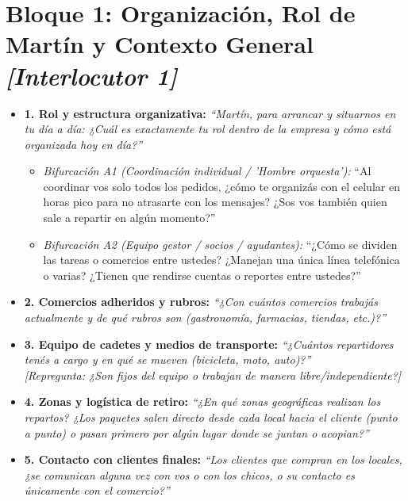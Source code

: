 \documentclass[11pt,a4paper]{article}
\begin{document}
\section*{Bloque 1: Organización, Rol de Martín y Contexto General \hfill \normalfont\small\itshape [Interlocutor 1]}
\begin{itemize}
  \item \textbf{1. Rol y estructura organizativa:}
  \textit{``Martín, para arrancar y situarnos en tu día a día: ¿Cuál es exactamente tu rol dentro de la empresa y cómo está organizada hoy en día?''}
  
  \begin{itemize}[label=$\circ$]
    \item \textit{Bifurcación A1 (Coordinación individual / 'Hombre orquesta'):} 
    ``Al coordinar vos solo todos los pedidos, ¿cómo te organizás con el celular en horas pico para no atrasarte con los mensajes? ¿Sos vos también quien sale a repartir en algún momento?''
    \item \textit{Bifurcación A2 (Equipo gestor / socios / ayudantes):} 
    ``¿Cómo se dividen las tareas o comercios entre ustedes? ¿Manejan una única línea telefónica o varias? ¿Tienen que rendirse cuentas o reportes entre ustedes?''
  \end{itemize}

  \item \textbf{2. Comercios adheridos y rubros:}
  \textit{``¿Con cuántos comercios trabajás actualmente y de qué rubros son (gastronomía, farmacias, tiendas, etc.)?''}

  \item \textbf{3. Equipo de cadetes y medios de transporte:}
  \textit{``¿Cuántos repartidores tenés a cargo y en qué se mueven (bicicleta, moto, auto)?''}\\
  \textit{\small[Repregunta: ¿Son fijos del equipo o trabajan de manera libre/independiente?]}

  \item \textbf{4. Zonas y logística de retiro:}
  \textit{``¿En qué zonas geográficas realizan los repartos? ¿Los paquetes salen directo desde cada local hacia el cliente (punto a punto) o pasan primero por algún lugar donde se juntan o acopian?''}

  \item \textbf{5. Contacto con clientes finales:}
  \textit{``Los clientes que compran en los locales, ¿se comunican alguna vez con vos o con los chicos, o su contacto es únicamente con el comercio?''}
\end{itemize}
\end{document}

